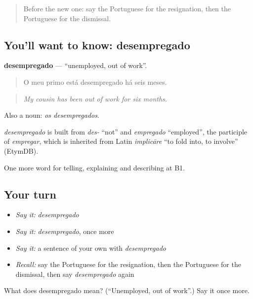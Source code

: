 \begin{quote}
Before the new one: say the Portuguese for the resignation, then the Portuguese for the dismissal.
\end{quote}

\subsection*{You'll want to know: desempregado}
\textbf{desempregado} — \textquotedblleft{}unemployed, out of work\textquotedblright{}.

\begin{quote}
O meu primo está desempregado há seis meses.
\end{quote}

\begin{quote}
\emph{My cousin has been out of work for six months.}
\end{quote}

Also a noun: \emph{os desempregados}.

\begin{cousinweb}
\emph{desempregado} is built from \emph{des-} \textquotedblleft{}not\textquotedblright{} and \emph{empregado} \textquotedblleft{}employed\textquotedblright{}, the participle of \emph{empregar}, which is inherited from Latin \emph{implicāre} \textquotedblleft{}to fold into, to involve\textquotedblright{} (EtymDB).
\end{cousinweb}

\begin{grammarlens}[title={What you've built}]
One more word for telling, explaining and describing at B1.
\end{grammarlens}

\subsection*{Your turn}
\begin{itemize}
\raggedright
  \item \emph{Say it:} \emph{desempregado}
  \item \emph{Say it:} \emph{desempregado}, once more
  \item \emph{Say it:} a sentence of your own with \emph{desempregado}
  \item \emph{Recall:} say the Portuguese for the resignation, then the Portuguese for the dismissal, then say \emph{desempregado} again
\end{itemize}

\begin{tcolorbox}[breakable,colback=teal!4,colframe=teal!35!black,title={Before you move on}]
What does desempregado mean? (\textquotedblleft{}Unemployed, out of work\textquotedblright{}.) Say it once more.
\end{tcolorbox}
